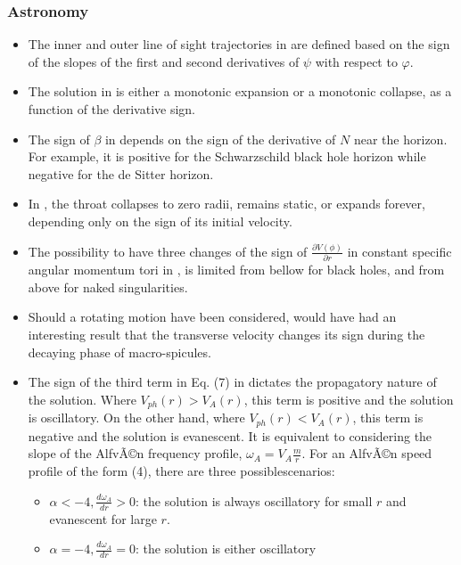 \documentclass[11pt]{book}
\begin{document}
\subsubsection{Astronomy}
\begin{itemize}
\item The inner and outer line of sight trajectories in \cite{everett2001emission}
are defined based on the sign of the slopes of the first and second
derivatives of $\psi$ with respect to $\varphi$.
\item The solution in \cite{dabrowski2003phantom} is either a monotonic
expansion or a monotonic collapse, as a function of the derivative
sign.
\item The sign of $\beta$ in \cite{padmanabhan2004entropy}
depends on the sign of the derivative of $N$ near the horizon. For
example, it is positive for the Schwarzschild black hole horizon while
negative for the de Sitter horizon.
\item In \cite{eiroa2004cylindrical}, the throat collapses
to zero radii, remains static, or expands forever, depending only
on the sign of its initial velocity.
\item The possibility to have three changes of the sign of $\frac{\partial V\left(\phi\right)}{\partial r}$
in constant specific angular momentum tori in \cite{stuchlik2005aschenbach},
is limited from bellow for black holes, and from above for naked singularities.
\item Should a rotating motion have been considered, \cite{xia2005time}
would have had an interesting result that the transverse velocity
changes its sign during the decaying phase of macro-spicules.
\item The sign of the third term in Eq. (7) in \cite{verwichte2006fast}
dictates the propagatory nature of the solution. Where $V_{ph}\left(r\right)>V_{A}\left(r\right)$,
this term is positive and the solution is oscillatory. On the other
hand, where $V_{ph}\left(r\right)<V_{A}\left(r\right)$, this term
is negative and the solution is evanescent. It is equivalent to considering
the slope of the AlfvÃ©n frequency profile, $\omega_{A}=V_{A}\frac{m}{r}$.
For an AlfvÃ©n speed profile of the form (4), there are three possiblescenarios:
\begin{itemize}
\item $\alpha<-4,\frac{d\omega_{A}}{dr}>0$: the solution is always oscillatory
for small $r$ and evanescent for large $r$.
\item $\alpha=-4,\frac{d\omega_{A}}{dr}=0$: the solution is either oscillatory

\end{itemize}
\end{itemize}
\end{document}
